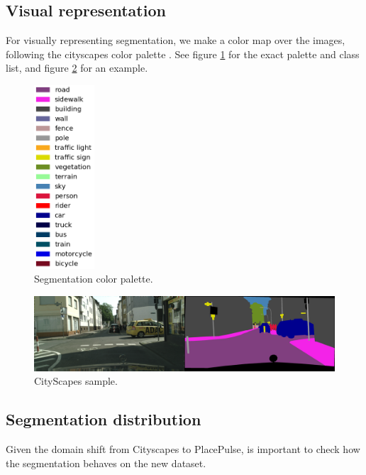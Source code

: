 \subsection{Visual representation}
\label{sec:seg_colors}
For visually representing segmentation, we make a color map over the images, following
the cityscapes color palette \cite{cordts_cityscapes}. See figure \ref{fig:segmentation_colors}
for the exact palette and class list, and figure \ref{fig:cs_sample} for an example.

\begin{figure}[ht]
	\begin{center}
	\includegraphics[width=0.2\textwidth]{./figures/seg_colors.png}
	\caption[Segmentation color palette]{
        Segmentation color palette.
        }
	\label{fig:segmentation_colors}
	\end{center}
\end{figure}

\begin{figure}[ht]
	\begin{center}
	\includegraphics[width=1\textwidth]{./figures/cityscapes_sample.png}
	\caption[CityScapes sample]{
        CityScapes sample.
        }
	\label{fig:cs_sample}
	\end{center}
\end{figure}

\subsection{Segmentation distribution}
Given the domain shift from Cityscapes to PlacePulse, is important to check how
the segmentation behaves on the new dataset.

